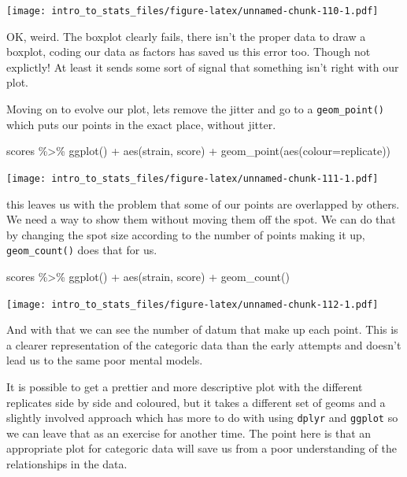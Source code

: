 \documentclass[
]{book}
\newenvironment{Shaded}{\begin{snugshade}}{\end{snugshade}}
\newcommand{\AttributeTok}[1]{\textcolor[rgb]{0.77,0.63,0.00}{#1}}
\newcommand{\FunctionTok}[1]{\textcolor[rgb]{0.00,0.00,0.00}{#1}}
\newcommand{\NormalTok}[1]{#1}
\newcommand{\SpecialCharTok}[1]{\textcolor[rgb]{0.00,0.00,0.00}{#1}}
\begin{document}
\texttt{[image: intro\_to\_stats\_files/figure-latex/unnamed-chunk-110-1.pdf]}

OK, weird. The boxplot clearly fails, there isn't the proper data to draw a boxplot, coding our data as factors has saved us this error too. Though not explictly! At least it sends some sort of signal that something isn't right with our plot.

Moving on to evolve our plot, lets remove the jitter and go to a \texttt{geom\_point()} which puts our points in the exact place, without jitter.

\begin{Shaded}
\begin{Highlighting}[]
\NormalTok{scores }\SpecialCharTok{\%\textgreater{}\%} \FunctionTok{ggplot}\NormalTok{() }\SpecialCharTok{+}
  \FunctionTok{aes}\NormalTok{(strain, score) }\SpecialCharTok{+} 
  \FunctionTok{geom\_point}\NormalTok{(}\FunctionTok{aes}\NormalTok{(}\AttributeTok{colour=}\NormalTok{replicate))}
\end{Highlighting}
\end{Shaded}

\texttt{[image: intro\_to\_stats\_files/figure-latex/unnamed-chunk-111-1.pdf]}

this leaves us with the problem that some of our points are overlapped by others. We need a way to show them without moving them off the spot. We can do that by changing the spot size according to the number of points making it up, \texttt{geom\_count()} does that for us.

\begin{Shaded}
\begin{Highlighting}[]
\NormalTok{scores }\SpecialCharTok{\%\textgreater{}\%} \FunctionTok{ggplot}\NormalTok{() }\SpecialCharTok{+}
  \FunctionTok{aes}\NormalTok{(strain, score) }\SpecialCharTok{+} 
  \FunctionTok{geom\_count}\NormalTok{()}
\end{Highlighting}
\end{Shaded}

\texttt{[image: intro\_to\_stats\_files/figure-latex/unnamed-chunk-112-1.pdf]}

And with that we can see the number of datum that make up each point. This is a clearer representation of the categoric data than the early attempts and doesn't lead us to the same poor mental models.

It is possible to get a prettier and more descriptive plot with the different replicates side by side and coloured, but it takes a different set of geoms and a slightly involved approach which has more to do with using \texttt{dplyr} and \texttt{ggplot} so we can leave that as an exercise for another time. The point here is that an appropriate plot for categoric data will save us from a poor understanding of the relationships in the data.
\end{document}
